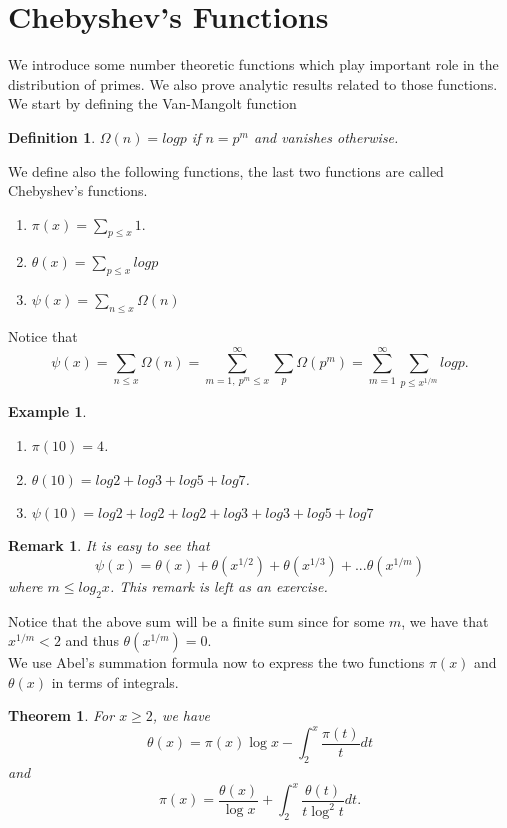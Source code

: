 \documentclass[12pt,letterpaper]{book}
\newtheorem{theorem}{Theorem}
\newtheorem{def1}{Definition}
\newtheorem{remark}{Remark}
\newtheorem{example}{Example}
\begin{document}
\section{Chebyshev's Functions} 
We introduce some number theoretic functions which play important
role in the distribution of primes.  We also prove analytic results
related to those functions. We start by defining the Van-Mangolt
function 
\begin{def1}
$\Omega(n)=logp$ if $n=p^m$ and vanishes otherwise.
\end{def1}
We define also the following functions, the last two functions are
called Chebyshev's functions.
\begin{enumerate}
\item{$\pi(x)=\sum_{p\leq x}1.$}\item{$\theta(x)=\sum_{p\leq x}log
p$}\item{$\psi(x)=\sum_{n\leq x}\Omega(n)$}
\end{enumerate}
Notice that
\begin{equation*}
\psi(x)=\sum_{n\leq x}\Omega(n)=\sum_{m=1, \ p^m\leq
x}^{\infty}\sum_p\Omega(p^m)=\sum_{m=1}^{\infty}\sum_{p\leq
x^{1/m}}log p.
\end{equation*}
\begin{example}
\begin{enumerate}
\item{$\pi(10)=4$.} \item{$\theta(10)=log 2+ log 3+ log 5+log
7$.}\item{$\psi(10)=log 2+ log 2+log 2+ log 3+ log 3+ log 5+ log 7$}
\end{enumerate}
\end{example}
\begin{remark}
It is easy to see that
\begin{equation*}
\psi(x)=\theta(x)+\theta(x^{1/2})+
\theta(x^{1/3})+...\theta(x^{1/m})
\end{equation*}
where $m\leq log_2x$.  This remark is left as an exercise.
\end{remark}
Notice that the above sum will be a finite sum since for some $m$,
we have that $x^{1/m}<2$ and thus $\theta(x^{1/m})=0$.\\
We use Abel's summation formula now to express the two functions
$\pi(x)$ and $\theta(x)$  in terms of integrals.
\begin{theorem}
For $x\geq 2$, we have
\begin{equation*}
\theta(x)=\pi(x)\log x-\int_ {2}^{x}\frac{\pi(t)}{t}dt
\end{equation*}
and
\begin{equation*}
 \pi(x)=\frac{\theta(x)}{\log x}+\int_{2}^x\frac{\theta(t)}{t\log^2t}dt.
 \end{equation*}
\end{theorem}
\end{document}
